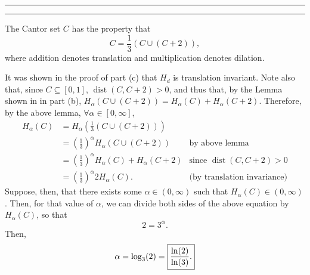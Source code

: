 \documentclass[11pt]{article}
\newcounter{questionCounter}
\newcounter{partCounter}[questionCounter]
\newenvironment{question}[2][\arabic{questionCounter}]{%
    \setcounter{partCounter}{0}%
    \vspace{.25in} \hrule \vspace{0.5em}%
        \noindent{\bf #2}%
    \vspace{0.8em} \hrule \vspace{.10in}%
    \addtocounter{questionCounter}{1}%
}{}
\newcommand{\dist}{\operatorname{dist}}
\begin{document}
\begin{question}{Problem 4}
\begin{enumerate}[(a)]
The Cantor set $C$ has the property that
\[C = \frac13\left(C \cup (C + 2)\right),\]
where addition denotes translation and multiplication denotes dilation.

It was shown in the proof of part (c) that $H_d$ is translation invariant.
Note also that, since $C \subseteq [0,1]$, $\dist(C,C + 2) > 0$, and thus
that, by the Lemma shown in in part (b),
$H_{\alpha}(C \cup (C + 2)) = H_{\alpha}(C) + H_{\alpha}(C + 2)$.
Therefore, by the above lemma, $\forall \alpha \in [0,\infty]$,
\begin{align*}
H_{\alpha}(C)
 & = H_{\alpha}\left(\frac13\left(C \cup (C + 2)\right)\right) \\
 & = \left(\frac13\right)^{\alpha} H_{\alpha}(C \cup (C + 2))           & \mbox{by above lemma}            \\
 & = \left(\frac13\right)^{\alpha} H_{\alpha}(C) + H_{\alpha}(C + 2)    & \mbox{since $\dist(C,C + 2) > 0$} \\
 & = \left(\frac13\right)^{\alpha} 2H_{\alpha}(C).                      & \mbox{(by translation invariance)}
\end{align*}
Suppose, then, that there exists some $\alpha \in (0,\infty)$ such that
$H_{\alpha}(C) \in (0,\infty)$. Then, for that value of $\alpha$, we can
divide both sides of the above equation by $H_{\alpha}(C)$, so that
\[2 = 3^{\alpha}.\]
Then,
\[\alpha = \log_{3}(2) = \mbox{\fbox{$\displaystyle \frac{\ln(2)}{\ln(3)}$.}}\]

\end{enumerate}
\end{question}
\end{document}
